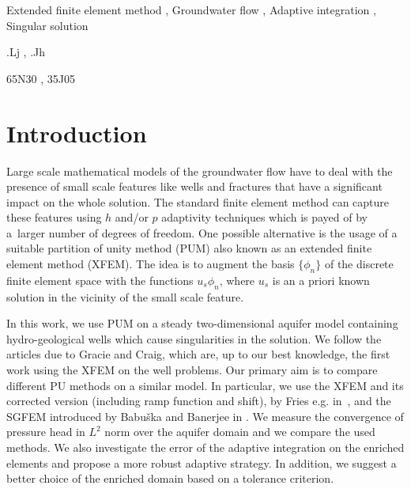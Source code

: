 \documentclass{elsarticle}
\begin{document}
\begin{frontmatter}
\begin{abstract}
\end{abstract}

\begin{keyword}
Extended finite element method \sep 
Groundwater flow \sep
Adaptive integration \sep 
Singular solution 

.Lj \sep        %
.Jh             %

\MSC[2010] 65N30 \sep %
\MSC[2010] 35J05  %

\end{keyword}

\end{frontmatter}


\section{Introduction}
\label{sec:introduction}

Large scale mathematical models of the groundwater flow have to deal with the presence of small scale features like wells 
and fractures that have a significant impact on the whole solution. The standard finite element method can 
capture these features using $h$ and/or $p$ adaptivity techniques 
which is payed of by a~larger number of degrees of freedom. One possible alternative is the usage of 
a suitable partition of unity method (PUM) also known as an extended finite element method (XFEM). The idea is to 
augment the basis $\{\phi_n\}$ of the discrete finite element space with the functions $u_s \phi_n$, where $u_s$ is 
an a priori known solution in the vicinity of the small scale feature. 

In this work, we use PUM on a steady two-dimensional aquifer model containing hydro-geological wells which
cause singularities in the solution. We follow the articles \cite{gracie_modelling_2010, craig_using_2011} due to Gracie and Craig,
which are, up to our best knowledge, the first work using the XFEM on the well problems.
Our primary aim is to compare different PU methods on a similar model. In particular, we use the XFEM 
and its corrected version (including ramp function and shift), by Fries e.g. in~\cite{fries_corrected_2008}, 
and the SGFEM introduced by Babu{\v s}ka and Banerjee in \cite{babuska_stable_2012, gupta_stable_2013}. We measure 
the convergence of pressure head in $L^2$ norm over the aquifer domain and we compare the used methods. 
We also investigate the error of the adaptive integration on the enriched elements and propose a more robust adaptive strategy.
In addition, we suggest a better choice of the enriched domain based on a tolerance criterion.
\end{document}
